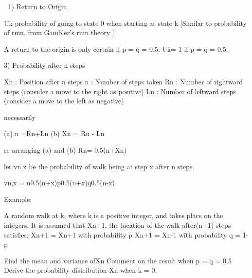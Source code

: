 
1) Return to Origin

Uk	probability of going to state 0 when starting at state k 
	[Similar to probability of ruin, from Gambler's ruin theory ]

A return to the origin is only certain if p = q = 0.5.
Uk= 1 if p = q = 0.5.

3) Probability after n steps

Xn : Position after n steps
n   : Number of steps taken
Rn : Number of rightward steps (consider a move to the right as positive)
Ln : Number of leftward steps (consider a move to the left as negative)

	necessarily
	
	 (a) n =Rn+Ln		 (b) Xn = Rn - Ln 

re-arranging (a) and (b)   Rn= 0.5(n+Xn) 

let vn,x be the probability of walk being at step x after n steps.

vn,x =  n0.5(n+x)p0.5(n+x)q0.5(n-x)


Example: 

A random walk at k, where k is a positive integer, and takes place on the integers. It is assumed that Xn+1, the location of the walk after(n+1) steps satisfies;
	Xn+1 = Xn+1 with probability p
	Xn+1 = Xn-1 with probability q = 1-p

Find the mean and variance ofXn
Comment on the result when p = q = 0.5
Derive the probability distribution Xn when k = 0.

